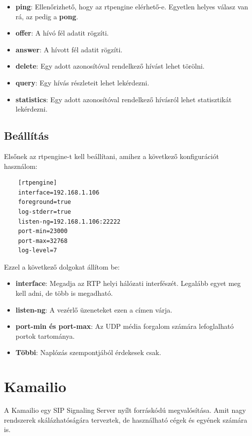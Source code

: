 \begin{itemize}
	\item \textbf{ping}: Ellenőrizhető, hogy az rtpengine elérhető-e. Egyetlen helyes 
	válasz van rá, az pedig a \textbf{pong}.
	\item \textbf{offer}: A hívó fél adatit rögzíti.
	\item \textbf{answer}: A hívott fél adatit rögzíti. 
	\item \textbf{delete}: Egy adott azonosítóval rendelkező hívást lehet törölni.
	\item \textbf{query}: Egy hívás részleteit lehet lekérdezni. 
	\item \textbf{statistics}: Egy adott azonosítóval rendelkező hívásról lehet statisztikát
	lekérdezni. 
\end{itemize} 

\subsection{Beállítás}

Elsőnek az rtpengine-t kell beállítani, amihez a következő konfigurációt 
használom: 

\begin{lstlisting}
	[rtpengine]
	interface=192.168.1.106
	foreground=true
	log-stderr=true
	listen-ng=192.168.1.106:22222
	port-min=23000
	port-max=32768
	log-level=7
\end{lstlisting}

Ezzel a következő dolgokat állítom be: 

\begin{itemize}
	\item \textbf{interface}: Megadja az RTP helyi hálózati interfészét. Legalább
	egyet meg kell adni, de több is megadható.
	\item \textbf{listen-ng}: A vezérlő üzeneteket ezen a címen várja. 
	\item \textbf{port-min és port-max}: Az UDP média forgalom számára lefoglalható
	portok tartománya. 
	\item \textbf{Többi}: Naplózás szempontjából érdekesek csak. 
\end{itemize}

\section{Kamailio}

A Kamailio egy SIP Signaling Server nyílt forráskódú megvalósítása. Amit nagy rendszerek
skálázhatóságára terveztek, de használható cégek és egyének számára is.

